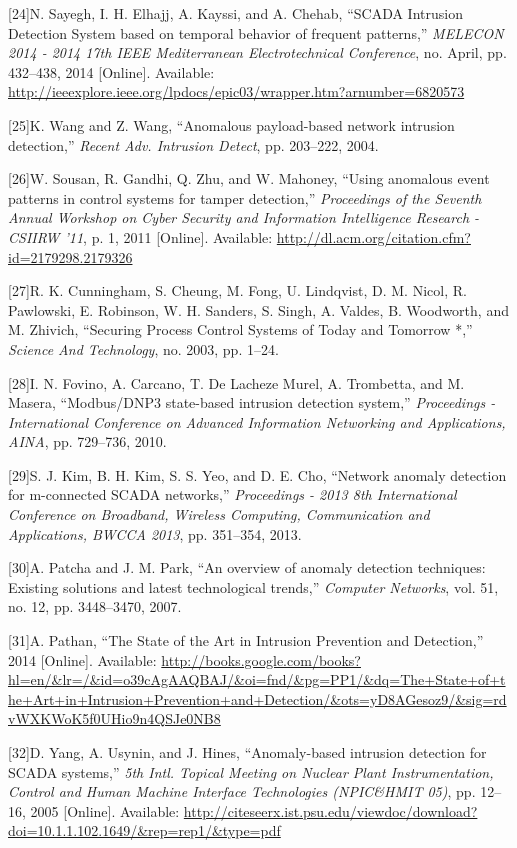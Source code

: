 \documentclass[11pt,]{article}
\begin{document}
{[}24{]}N. Sayegh, I. H. Elhajj, A. Kayssi, and A. Chehab, ``SCADA
Intrusion Detection System based on temporal behavior of frequent
patterns,'' \emph{MELECON 2014 - 2014 17th IEEE Mediterranean
Electrotechnical Conference}, no. April, pp. 432--438, 2014
{[}Online{]}. Available:
\url{http://ieeexplore.ieee.org/lpdocs/epic03/wrapper.htm?arnumber=6820573}

{[}25{]}K. Wang and Z. Wang, ``Anomalous payload-based network intrusion
detection,'' \emph{Recent Adv. Intrusion Detect}, pp. 203--222, 2004.

{[}26{]}W. Sousan, R. Gandhi, Q. Zhu, and W. Mahoney, ``Using anomalous
event patterns in control systems for tamper detection,''
\emph{Proceedings of the Seventh Annual Workshop on Cyber Security and
Information Intelligence Research - CSIIRW '11}, p. 1, 2011
{[}Online{]}. Available:
\url{http://dl.acm.org/citation.cfm?id=2179298.2179326}

{[}27{]}R. K. Cunningham, S. Cheung, M. Fong, U. Lindqvist, D. M. Nicol,
R. Pawlowski, E. Robinson, W. H. Sanders, S. Singh, A. Valdes, B.
Woodworth, and M. Zhivich, ``Securing Process Control Systems of Today
and Tomorrow *,'' \emph{Science And Technology}, no. 2003, pp. 1--24.

{[}28{]}I. N. Fovino, A. Carcano, T. {De Lacheze Murel}, A. Trombetta,
and M. Masera, ``Modbus/DNP3 state-based intrusion detection system,''
\emph{Proceedings - International Conference on Advanced Information
Networking and Applications, AINA}, pp. 729--736, 2010.

{[}29{]}S. J. Kim, B. H. Kim, S. S. Yeo, and D. E. Cho, ``Network
anomaly detection for m-connected SCADA networks,'' \emph{Proceedings -
2013 8th International Conference on Broadband, Wireless Computing,
Communication and Applications, BWCCA 2013}, pp. 351--354, 2013.

{[}30{]}A. Patcha and J. M. Park, ``An overview of anomaly detection
techniques: Existing solutions and latest technological trends,''
\emph{Computer Networks}, vol. 51, no. 12, pp. 3448--3470, 2007.

{[}31{]}A. Pathan, ``The State of the Art in Intrusion Prevention and
Detection,'' 2014 {[}Online{]}. Available:
\url{http://books.google.com/books?hl=en/\&lr=/\&id=o39cAgAAQBAJ/\&oi=fnd/\&pg=PP1/\&dq=The+State+of+the+Art+in+Intrusion+Prevention+and+Detection/\&ots=yD8AGesoz9/\&sig=rdvWXKWoK5f0UHio9n4QSJe0NB8}

{[}32{]}D. Yang, A. Usynin, and J. Hines, ``Anomaly-based intrusion
detection for SCADA systems,'' \emph{5th Intl. Topical Meeting on
Nuclear Plant Instrumentation, Control and Human Machine Interface
Technologies (NPIC\&HMIT 05)}, pp. 12--16, 2005 {[}Online{]}. Available:
\url{http://citeseerx.ist.psu.edu/viewdoc/download?doi=10.1.1.102.1649/\&rep=rep1/\&type=pdf}
\end{document}
